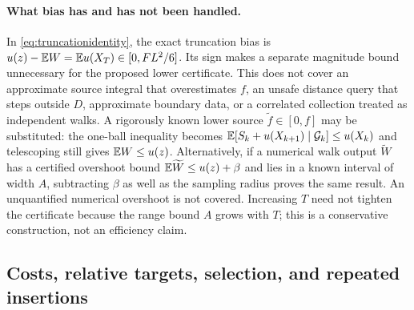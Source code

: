 \paragraph{What bias has and has not been handled.}
In \cref{eq:truncationidentity}, the exact truncation bias is
$u(z)-\mathbb{E} W=\mathbb{E} u(X_T)\in[0,FL^2/6]$. Its sign makes a separate magnitude
bound unnecessary for the proposed lower certificate. This does not cover
an approximate source integral that overestimates $f$, an unsafe distance
query that steps outside $D$, approximate boundary data, or a correlated
collection treated as independent walks. A rigorously known lower source
$\widetilde f\in[0,f]$ may be substituted: the one-ball inequality becomes
$\mathbb{E}[S_k+u(X_{k+1})\mid\mathcal G_k]\le u(X_k)$ and telescoping still gives
$\mathbb{E} W\le u(z)$. Alternatively, if a numerical walk output $\widetilde W$
has a certified overshoot bound $\mathbb{E}\widetilde W\le u(z)+\beta$ and lies in
a known interval of width $A$, subtracting $\beta$ as well as the sampling
radius proves the same result. An unquantified numerical overshoot is not
covered. Increasing $T$ need not tighten the certificate because the range
bound $A$ grows with $T$; this is a conservative construction, not an
efficiency claim.

\subsection{Costs, relative targets, selection, and repeated insertions}

